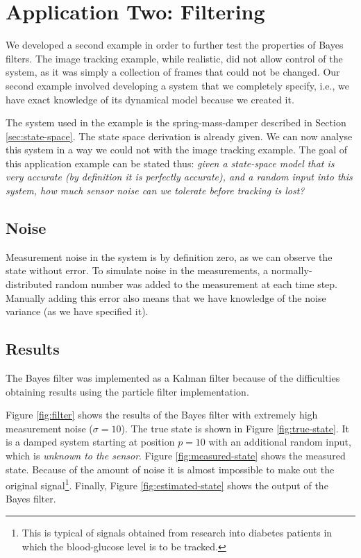 \section{Application Two: Filtering}
We developed a second example in order to further test the properties of Bayes
filters. The image tracking example, while realistic, did not allow control of
the system, as it was simply a collection of frames that could not be changed.
Our second example involved developing a system that we completely specify, i.e.,
we have exact knowledge of its dynamical model because we created it.

The system used in the example is the spring-mass-damper described in Section
\ref{sec:state-space}. The state space derivation is already given. We can now
analyse this system in a way we could not with the image tracking example. The
goal of this application example can be stated thus: \emph{given a state-space model that is
very accurate (by definition it is perfectly accurate), and a random input
into this system, how much sensor noise can we tolerate before tracking is lost?}

\subsection{Noise}
Measurement noise in the system is by definition zero, as we can observe the
state without error. To simulate noise in the measurements, a normally-distributed
random number was added to the measurement at each time step. Manually adding this
error also means that we have knowledge of the noise variance (as we have
specified it).

\subsection{Results}
The Bayes filter was implemented as a Kalman filter because of the difficulties
obtaining results using the particle filter implementation.

Figure \ref{fig:filter} shows the results of the Bayes filter with extremely
high measurement noise ($\sigma = 10$). The true state is shown in Figure
\ref{fig:true-state}. It is a damped system starting at position $p = 10$ with
an additional random input, which is \emph{unknown to the sensor}. Figure \ref{fig:measured-state}
shows the measured state. Because of the amount of noise it is almost impossible
to make out the original signal\footnote{This is typical of signals obtained
from research into diabetes patients in which the blood-glucose level is to be
tracked.}. Finally,
Figure \ref{fig:estimated-state} shows the output of the Bayes filter.


